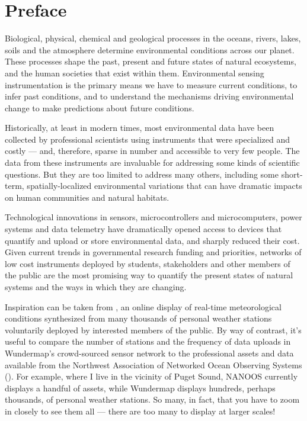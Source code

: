 \chapter*{Preface}

Biological, physical, chemical and geological processes in the oceans, rivers, lakes, soils and the atmosphere determine environmental conditions across our planet. 
These processes shape the past, present and future states of natural ecosystems, and the human societies that exist within them. 
Environmental sensing instrumentation is the primary means we have to measure current conditions, to infer past conditions, and to understand the mechanisms driving environmental change to make predictions about future conditions. 

Historically, at least in modern times, most environmental data have been collected by professional scientists using instruments that were specialized and costly --- and, therefore, sparse in number and accessible to very few people.
The data from these instruments are invaluable for addressing some kinds of scientific questions. 
But they are too limited to address many others, including some short-term, spatially-localized environmental variations that can have dramatic impacts on human communities and natural habitats.

Technological innovations in sensors, microcontrollers and microcomputers, power systems and data telemetry have dramatically opened access to devices that quantify and upload or store environmental data, and sharply reduced their cost.
Given current trends in governmental research funding and priorities, networks of low cost instruments deployed by students, stakeholders and other members of the public are the most promising way to quantify the present states of natural systems and the ways in which they are changing. 

Inspiration can be taken from , an online display of real-time meteorological conditions synthesized from many thousands of personal weather stations voluntarily deployed by interested members of the public. 
By way of contrast, it's useful to compare the number of stations and the frequency of data uploads in Wundermap's crowd-sourced sensor network to the professional assets and data available from the Northwest Association of Networked Ocean Observing Systems (). 
For example, where I live in the vicinity of Puget Sound, NANOOS currently displays a handful of assets, while Wundermap displays hundreds, perhaps thousands, of personal weather stations. 
So many, in fact, that you have to zoom in closely to see them all --- there are too many to display at larger scales!

